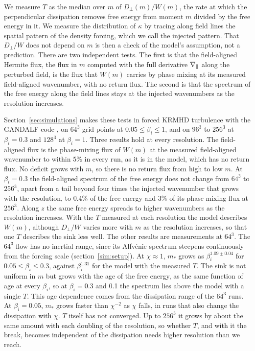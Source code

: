 We measure $T$ as the median over $m$ of $D_\perp(m)/W(m)$, the rate at which the perpendicular dissipation removes free energy from moment $m$ divided by the free energy in it. We measure the distribution of $\kappa$ by tracing along field lines the spatial pattern of the density forcing, which we call the injected pattern. That $D_\perp/W$ does not depend on $m$ is then a check of the model's assumption, not a prediction. There are two independent tests. The first is that the field-aligned Hermite flux, the flux in $m$ computed with the full derivative $\nabla_\parallel$ along the perturbed field, is the flux that $W(m)$ carries by phase mixing at its measured field-aligned wavenumber, with no return flux. The second is that the spectrum of the free energy along the field lines stays at the injected wavenumbers as the resolution increases.

Section~\ref{sec:simulations} makes these tests in forced KRMHD turbulence with the GANDALF code \citep{Kanekar2025}, on $64^3$ grid points at $0.05\le\beta_i\le1$, and on $96^3$ to $256^3$ at $\beta_i=0.3$ and $128^3$ at $\beta_i=1$. Three results hold at every resolution. The field-aligned flux is the phase-mixing flux of $W(m)$ at the measured field-aligned wavenumber to within 5\% in every run, as it is in the model, which has no return flux. No deficit grows with $m$, so there is no return flux from high to low $m$. At $\beta_i=0.3$ the field-aligned spectrum of the free energy does not change from $64^3$ to $256^3$, apart from a tail beyond four times the injected wavenumber that grows with the resolution, to 0.4\% of the free energy and 3\% of its phase-mixing flux at $256^3$. Along $z$ the same free energy spreads to higher wavenumbers as the resolution increases. With the $T$ measured at each resolution the model describes $W(m)$, although $D_\perp/W$ varies more with $m$ as the resolution increases, so that one $T$ describes the sink less well. The other results are measurements at $64^3$. The $64^3$ flow has no inertial range, since its Alfv\'enic spectrum steepens continuously from the forcing scale (section~\ref{sim:setup}). At $\chi\approx1$, $m_*$ grows as $\beta_i^{1.09\pm0.04}$ for $0.05\le\beta_i\le0.3$, against $\beta_i^{1.31}$ for the model with the measured $T$. The sink is not uniform in $m$ but grows with the age of the free energy, as the same function of age at every $\beta_i$, so at $\beta_i=0.3$ and 0.1 the spectrum lies above the model with a single $T$. This age dependence comes from the dissipation range of the $64^3$ runs. At $\beta_i=0.05$, $m_*$ grows faster than $\chi^{-2}$ as $\chi$ falls, in runs that also change the dissipation with $\chi$. $T$ itself has not converged. Up to $256^3$ it grows by about the same amount with each doubling of the resolution, so whether $T$, and with it the break, becomes independent of the dissipation needs higher resolution than we reach.


